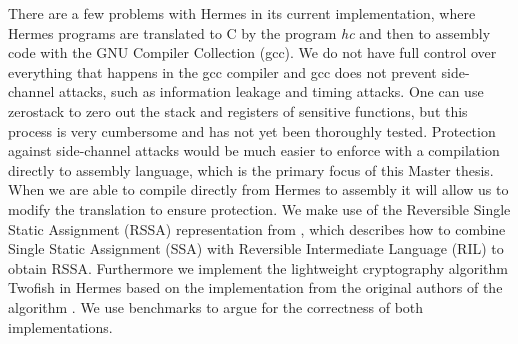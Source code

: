 There are a few problems with Hermes in its current implementation, where Hermes programs are translated to C by the program \emph{hc} and then to assembly code with the GNU Compiler Collection (gcc).
We do not have full control over everything that happens in the gcc compiler and gcc does not prevent side-channel attacks, such as information leakage and timing attacks\cite{Simon2018}.
One can use zerostack\cite{Github.zerostack} to zero out the stack and registers of sensitive functions, but this process is very cumbersome and has not yet been thoroughly tested. 
Protection against side-channel attacks would be much easier to enforce with a compilation directly to assembly language, which is the primary focus of this Master thesis.
When we are able to compile directly from Hermes to assembly it will allow us to modify the translation to ensure protection.
We make use of the Reversible Single Static Assignment (RSSA) representation from \cite{10.1007/978-3-319-41579-6_16}, which describes how to combine Single Static Assignment (SSA) with Reversible Intermediate Language (RIL) to obtain RSSA.
Furthermore we implement the lightweight cryptography algorithm Twofish in Hermes based on the implementation from the original authors of the algorithm \cite{GIT2F}. We use benchmarks to argue for the correctness of both implementations.

